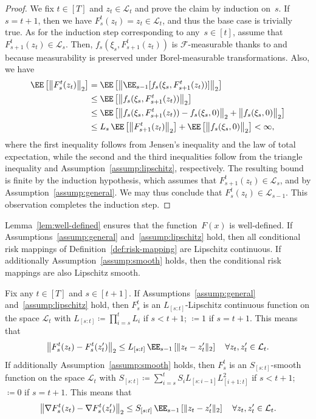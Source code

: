 \documentclass[11pt]{article}
\begin{document}
\begin{proof}
We fix $t\in[T]$ and $z_t\in\mathcal L_t$ and prove the claim by induction on~$s$. If $s=t+1$, then we have $F_s^t(z_t)=z_t\in\mathcal L_t$, and thus the base case is trivially true. As for the induction step corresponding to any~$s\in[t]$, assume that $F_{s+1}^t(z_t)\in\mathcal L_s$. Then, $f_{s}(\xi_{s}, F_{s+1}^t(z_t))$ is $\mathcal F$-measurable thanks to \cite[Lemma~4.51]{aliprantisinfinite} and because measurability is preserved under Borel-measurable transformations. Also, we have
\begin{align*}
    \EE\left[ \big\| F_s^t(z_t)\big\|_2 \right] & = \EE\left[ \big\| \EE_{s-1} [ f_s(\xi_s,F_{s+1}^t(z_t))] \big\|_2 \right]\\
    & \leq \EE\left[ \big\| f_s(\xi_s,F_{s+1}^t(z_t)) \big\|_2 \right] \\
    & \leq \EE\left[ \big\| f_s(\xi_s,F_{s+1}^t(z_t))-f_s(\xi_s,0) \big\|_2 + \big\| f_s(\xi_s,0) \big\|_2 \right] \\
    & \leq L_s\, \EE\left[ \big\|F_{s+1}^t(z_t)\big\|_2\right] + \EE\left[\big\| f_s(\xi_s,0) \big\|_2 \right] <\infty,
\end{align*}
where the first inequality follows from Jensen's inequality and the law of total expectation, while the second and the third inequalities follow from the triangle inequality and Assumption~\ref{assump:lipschitz}, respectively. The resulting bound is finite by the induction hypothesis, which assumes that $F_{s+1}^t(z_t)\in\mathcal L_s$, and by Assumption~\ref{assump:general}. We may thus conclude that $F_{s}^t(z_t)\in\mathcal L_{s-1}$. This observation completes the induction step.
\end{proof}

Lemma~\ref{lem:well-defined} ensures that the function~$F(x)$ is well-defined. If Assumptions~\ref{assump:general} and~\ref{assump:lipschitz} hold, then all conditional risk mappings of Definition~\ref{def:risk-mapping} are Lipschitz continuous. If additionally Assumption~\ref{assump:smooth} holds, then the conditional risk mappings are also Lipschitz smooth.

\begin{lemma}\label{lem:lipschitz}
Fix any $t\in[T]$ and $s\in[t+1]$. If Assumptions~\ref{assump:general} and~\ref{assump:lipschitz} hold, then $F_s^t$ is an $L_{[s:t]}$-Lipschitz continuous function on the space $\mathcal L_t$ with $L_{[s:t]}\coloneqq\prod_{i=s}^t L_i$ if $s<t+1$; $\coloneqq1$ if $s=t+1$. This means that
\[
     \big\|F_s^t(z_t) - F_s^t(z'_t) \big\|_2 \leq L_{[s:t]} \, \EE_{s-1} \left[ \|z_t-z'_t\|_2\right] \quad \forall z_t,z'_t\in\mathcal L_t.
\]
If additionally Assumption~\ref{assump:smooth} holds, then $F_s^t$ is an $S_{[s:t]}$-smooth function on the space $\mathcal L_t$ with $S_{[s:t]}\coloneqq\sum_{i=s}^{t} S_i L_{[s:i-1]} L_{[i+1:t]}^2$ if $s<t+1$; $\coloneqq0$ if $s=t+1$. This means that
\[
     \big\|\nabla F_s^t(z_t) - \nabla F_s^t(z'_t) \big\|_2 \leq S_{[s:t]} \, \EE_{s-1} \left[ \|z_t-z'_t\|_2\right] \quad \forall z_t,z'_t\in\mathcal L_t.
\]
\end{lemma}
\end{document}
